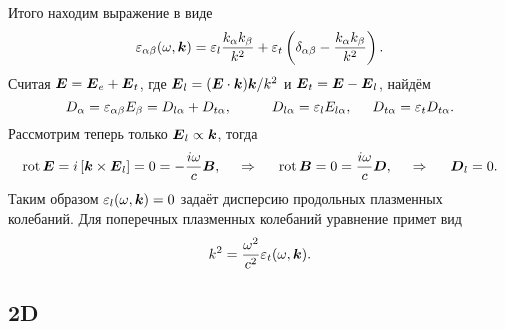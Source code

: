 Итого находим выражение в виде
\begin{equation*}
	\varepsilon_{\alpha \beta}(\omega, \boldsymbol{k}) = \varepsilon_l \frac{k_\alpha k_\beta}{k^2} + \varepsilon_t \left(
		\delta_{\alpha \beta} - \frac{k_\alpha k_\beta}{k^2}
	\right).
\end{equation*}
Считая $\boldsymbol{E} = \boldsymbol{E}_e + \boldsymbol{E}_t$, где $\boldsymbol{E}_l = (\boldsymbol{E} \cdot \boldsymbol{k}) \boldsymbol{k} / k^2$ и $\boldsymbol{E}_t = \boldsymbol{E}- \boldsymbol{E}_l$, найдём
\begin{equation*}
	D_\alpha = \varepsilon_{\alpha \beta} E_\beta = D_{l\alpha} + D_{t \alpha}, 
	\hspace{10 mm} 
	D_{l \alpha} = \varepsilon_l E_{l \alpha},
	\hspace{5 mm} 
	D_{t \alpha} = \varepsilon_t D_{t \alpha}.
\end{equation*}
Рассмотрим теперь только $\boldsymbol{E}_l \propto \boldsymbol{k}$, тогда
\begin{equation*}
	\mathop{\mathrm{rot}}\nolimits \boldsymbol{E} = i \left[
		\boldsymbol{k} \times  \boldsymbol{E}_l
	\right] = 0 = - \frac{i \omega}{c} \boldsymbol{B},
	\hspace{0.5cm} \Rightarrow \hspace{0.5cm}
	\mathop{\mathrm{rot}}\nolimits \boldsymbol{B} = 0 = \frac{i \omega}{c} \boldsymbol{D},
	\hspace{0.5cm} \Rightarrow \hspace{0.5cm}
	\boldsymbol{D}_l = 0.
\end{equation*}
Таким образом $\varepsilon_l (\omega, \boldsymbol{k}) = 0$  задаёт дисперсию продольных плазменных колебаний. Для поперечных плазменных колебаний уравнение примет вид
\begin{equation*}
	k^2 = \frac{\omega^2}{c^2} \varepsilon_t (\omega, \boldsymbol{k}).
\end{equation*}




\subsection*{2D}

